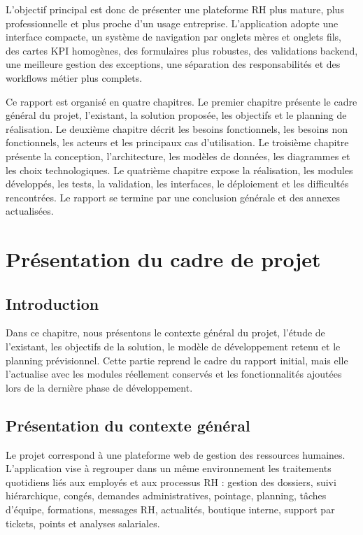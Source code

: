 \documentclass[12pt,a4paper]{report}
\begin{document}
L'objectif principal est donc de présenter une plateforme RH plus mature, plus professionnelle et plus proche d'un usage entreprise. L'application adopte une interface compacte, un système de navigation par onglets mères et onglets fils, des cartes KPI homogènes, des formulaires plus robustes, des validations backend, une meilleure gestion des exceptions, une séparation des responsabilités et des workflows métier plus complets.

Ce rapport est organisé en quatre chapitres. Le premier chapitre présente le cadre général du projet, l'existant, la solution proposée, les objectifs et le planning de réalisation. Le deuxième chapitre décrit les besoins fonctionnels, les besoins non fonctionnels, les acteurs et les principaux cas d'utilisation. Le troisième chapitre présente la conception, l'architecture, les modèles de données, les diagrammes et les choix technologiques. Le quatrième chapitre expose la réalisation, les modules développés, les tests, la validation, les interfaces, le déploiement et les difficultés rencontrées. Le rapport se termine par une conclusion générale et des annexes actualisées.
\newpage

\chapter{Présentation du cadre de projet}
\section{Introduction}
Dans ce chapitre, nous présentons le contexte général du projet, l'étude de l'existant, les objectifs de la solution, le modèle de développement retenu et le planning prévisionnel. Cette partie reprend le cadre du rapport initial, mais elle l'actualise avec les modules réellement conservés et les fonctionnalités ajoutées lors de la dernière phase de développement.

\section{Présentation du contexte général}
Le projet correspond à une plateforme web de gestion des ressources humaines. L'application vise à regrouper dans un même environnement les traitements quotidiens liés aux employés et aux processus RH : gestion des dossiers, suivi hiérarchique, congés, demandes administratives, pointage, planning, tâches d'équipe, formations, messages RH, actualités, boutique interne, support par tickets, points et analyses salariales.
\end{document}
